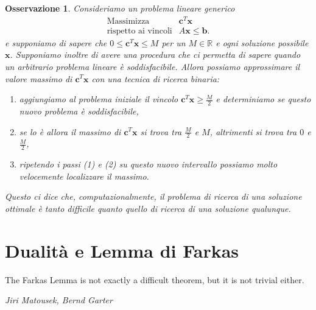 \documentclass[italian, 12pt, reqno]{article}
\theoremstyle{myteo}
\newtheorem{remark}[theorem]{Osservazione}
\numberwithin{equation}{section}
\begin{document}
\begin{remark}
  \label{oss:binary_search}
  Consideriamo un problema lineare generico
  \begin{equation*}
    \begin{array}{ll}
      \text{Massimizza} & \mathbf{c}^T\mathbf{x}\\
      \text{rispetto ai vincoli} & A\mathbf{x}\leq\mathbf{b}.
    \end{array}
  \end{equation*}
  e supponiamo di sapere che \(0\leq \mathbf{c}^T\mathbf{x}\leq M\) per un \(M\in\mathbb{R}\) e ogni soluzione possibile \(\mathbf{x}\).
  Supponiamo inoltre di avere una procedura che ci permetta di sapere quando un arbitrario problema lineare è soddisfacibile.
  Allora possiamo approssimare il valore massimo di \(\mathbf{c}^T\mathbf{x}\) con una tecnica di ricerca binaria:
  \begin{enumerate}
  \item aggiungiamo al problema iniziale il vincolo \(\mathbf{c}^T\mathbf{x}\geq \frac{M}{2}\) e determiniamo se questo nuovo problema è soddisfacibile,
  \item se lo è allora il massimo di \(\mathbf{c}^T\mathbf{x}\) si trova tra \(\frac{M}{2}\) e \(M\), altrimenti si trova tra \(0\) e \(\frac{M}{2}\),
  \item ripetendo i passi (1) e (2) su questo nuovo intervallo possiamo molto velocemente localizzare il massimo.
  \end{enumerate}
  Questo ci dice che, computazionalmente, il problema di ricerca di una soluzione ottimale è tanto difficile quanto quello di ricerca di una soluzione qualunque.
\end{remark}

\newpage
\section{Dualità e Lemma di Farkas}
\label{sec:dualità_e_lemma_di_farkas}
\setcounter{figure}{0}
\epigraph{The Farkas Lemma is not exactly a difficult theorem, but it is not trivial either.}{\textit{Jiri Matousek, Bernd Garter}}
\end{document}

